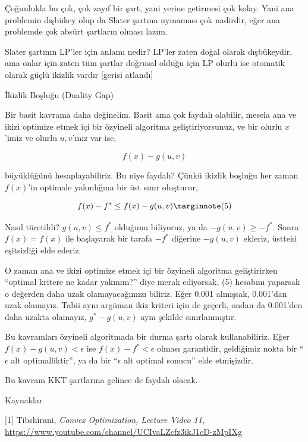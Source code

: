 \documentclass[12pt,fleqn]{article}\usepackage{../../common}
\begin{document}
Çoğunlukla bu çok, çok zayıf bir şart, yani yerine getirmesi çok
kolay. Yani ana problemin dışbükey olup da Slater şartına uymaması çok
nadirdir, eğer ana problemde çok absürt şartların olması lazım. 

Slater şartının LP'ler için anlamı nedir? LP'ler zaten doğal olarak
dışbükeydir, ama onlar için zaten tüm şartlar doğrusal olduğu için LP
olurlu ise otomatik olarak güçlü ikizlik vardır [gerisi atlandı] 

İkizlik Boşluğu (Duality Gap)

Bir basit kavrama daha değinelim. Basit ama çok faydalı olabilir, mesela
ana ve ikizi optimize etmek içi bir özyineli algoritma geliştiriyorsunuz,
ve bir olurlu $x$'imiz ve olurlu $u,v$'miz var ise, 

$$
f(x) - g(u,v)
$$

büyüklüğünü hesaplayabiliriz. Bu niye faydalı? Çünkü ikizlik boşluğu her
zaman $f(x)$'in optimale yakınlığına bir üst sınır oluşturur, 

$$
f(x) - f^* \le f(x) - g(u,v) 
\mlabel{5}
$$

Nasıl türetildi? $g(u,v) \le f^*$ olduğunu biliyoruz, ya da
$-g(u,v) \ge -f^*$. Sonra $f(x)=f(x)$ ile başlayarak bir tarafa $-f^*$
diğerine $-g(u,v)$ ekleriz, üstteki eşitsizliği elde ederiz.

O zaman ana ve ikizi optimize etmek içi bir özyineli algoritma
geliştirirken ``optimal kritere ne kadar yakınım?'' diye merak ediyorsak,
(5) hesabını yaparsak o değerden daha uzak olamayacağımızı biliriz. Eğer
0.001 almışsak, 0.001'dan uzak olamayız. Tabii aynı argüman ikiz kriteri
için de geçerli, ondan da 0.001'den daha uzakta olamayız, $g^*-g(u,v)$ aynı
şekilde sınırlanmıştır.

Bu kavramları özyineli algoritmada bir durma şartı olarak kullanabiliriz.
Eğer $f(x) - g(u,v) < \epsilon$ ise $f(x) - f^* < \epsilon$ olması
garantidir, geldiğimiz nokta bir ``$\epsilon$ alt optimalliktir'', ya da
bir ``$\epsilon$ alt optimal sonucu'' elde etmişizdir.

Bu kavram KKT şartlarına gelince de faydalı olacak. 

Kaynaklar

[1] Tibshirani, {\em Convex Optimization, Lecture Video 11}, 
\url{https://www.youtube.com/channel/UCIvaLZcfz3ikJ1cD-zMpIXg}   
\end{document}
